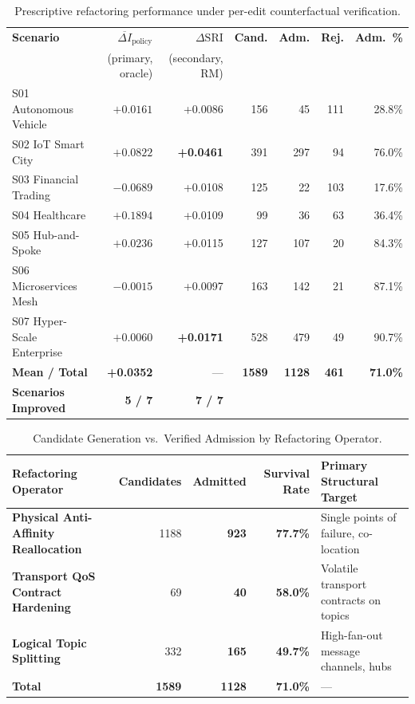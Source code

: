 \begin{table}[htbp]
\centering
\footnotesize
\setlength{\tabcolsep}{2.5pt}
\caption{Prescriptive refactoring performance under per-edit counterfactual verification.}
\label{tab:prescriptive_results}
\begin{tabular}{lrrrrrr}
\toprule
\textbf{Scenario} & $\overline{\Delta I}_{\text{policy}}$ & $\Delta\mathrm{SRI}$ & \textbf{Cand.} & \textbf{Adm.} & \textbf{Rej.} & \textbf{Adm.\ \%} \\
 & \scriptsize(primary, oracle) & \scriptsize(secondary, RM) & & & & \\
\midrule
S01 Autonomous Vehicle & $+0.0161$ & +0.0086 & 156 & 45 & 111 & 28.8\% \\
S02 IoT Smart City & $+0.0822$ & \textbf{+0.0461} & 391 & 297 & 94 & 76.0\% \\
S03 Financial Trading & $\mathbf{-0.0689}$ & +0.0108 & 125 & 22 & 103 & 17.6\% \\
S04 Healthcare & $\mathbf{+0.1894}$ & +0.0109 & 99 & 36 & 63 & 36.4\% \\
S05 Hub-and-Spoke & $+0.0236$ & +0.0115 & 127 & 107 & 20 & 84.3\% \\
S06 Microservices Mesh & $\mathbf{-0.0015}$ & +0.0097 & 163 & 142 & 21 & 87.1\% \\
S07 Hyper-Scale Enterprise & $+0.0060$ & \textbf{+0.0171} & 528 & 479 & 49 & 90.7\% \\
\midrule
\textbf{Mean / Total} & \textbf{+0.0352} & --- & \textbf{1589} & \textbf{1128} & \textbf{461} & \textbf{71.0\%} \\
\textbf{Scenarios Improved} & \textbf{5 / 7} & \textbf{7 / 7} & & & & \\
\bottomrule
\end{tabular}
\end{table}

\begin{table}[htbp]
\centering
\footnotesize
\setlength{\tabcolsep}{3.5pt}
\caption{Candidate Generation vs.\ Verified Admission by Refactoring Operator.}
\label{tab:operator_results}
\begin{tabularx}{\textwidth}{lrrr>{\raggedright\arraybackslash}X}
\toprule
\textbf{Refactoring Operator} & \textbf{Candidates} & \textbf{Admitted} & \textbf{Survival Rate} & \textbf{Primary Structural Target} \\
\midrule
\textbf{Physical Anti-Affinity Reallocation} & 1188 & \textbf{923} & \textbf{77.7\%} & Single points of failure, co-location \\
\textbf{Transport QoS Contract Hardening} & 69 & \textbf{40} & \textbf{58.0\%} & Volatile transport contracts on topics \\
\textbf{Logical Topic Splitting} & 332 & \textbf{165} & \textbf{49.7\%} & High-fan-out message channels, hubs \\
\midrule
\textbf{Total} & \textbf{1589} & \textbf{1128} & \textbf{71.0\%} & --- \\
\bottomrule
\end{tabularx}
\end{table}

